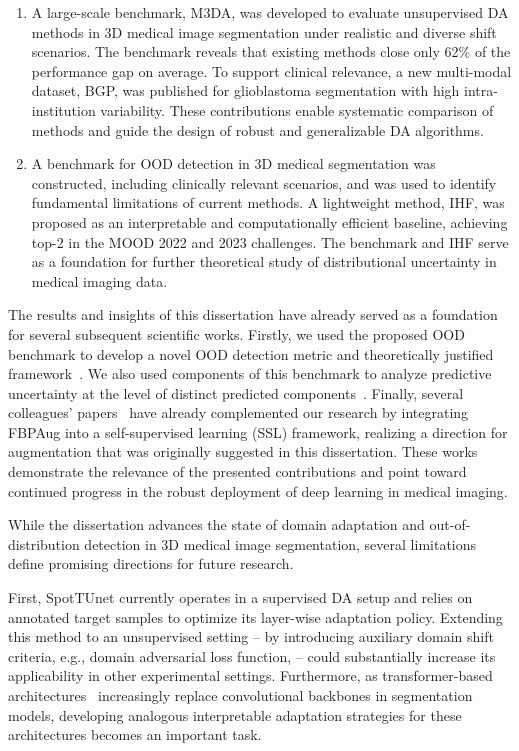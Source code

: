 \begin{enumerate}
	\item A large-scale benchmark, M3DA, was developed to evaluate unsupervised DA methods in 3D medical image segmentation under realistic and diverse shift scenarios. The benchmark reveals that existing methods close only 62\% of the performance gap on average. To support clinical relevance, a new multi-modal dataset, BGP, was published for glioblastoma segmentation with high intra-institution variability. These contributions enable systematic comparison of methods and guide the design of robust and generalizable DA algorithms.
	
	\item A benchmark for OOD detection in 3D medical segmentation was constructed, including clinically relevant scenarios, and was used to identify fundamental limitations of current methods. A lightweight method, IHF, was proposed as an interpretable and computationally efficient baseline, achieving top-2 in the MOOD 2022 and 2023 challenges. The benchmark and IHF serve as a foundation for further theoretical study of distributional uncertainty in medical imaging data.
	
\end{enumerate}

The results and insights of this dissertation have already served as a foundation for several subsequent scientific works. Firstly, we used the proposed OOD benchmark to develop a novel OOD detection metric and theoretically justified framework~\cite{vasiliuk2023redesigning}. We also used components of this benchmark to analyze predictive uncertainty at the level of distinct predicted components~\cite{vasiliuk2022exploring}. Finally, several colleagues’ papers~\cite{goncharov2023vox2vec,goncharov2024anatomical,goncharov2025screener} have already complemented our research by integrating FBPAug into a self-supervised learning (SSL) framework, realizing a direction for augmentation that was originally suggested in this dissertation. These works demonstrate the relevance of the presented contributions and point toward continued progress in the robust deployment of deep learning in medical imaging.

While the dissertation advances the state of domain adaptation and out-of-distribution detection in 3D medical image segmentation, several limitations define promising directions for future research.

First, SpotTUnet currently operates in a supervised DA setup and relies on annotated target samples to optimize its layer-wise adaptation policy. Extending this method to an unsupervised setting -- by introducing auxiliary domain shift criteria, e.g., domain adversarial loss function, -- could substantially increase its applicability in other experimental settings. Furthermore, as transformer-based architectures~\cite{unetr} increasingly replace convolutional backbones in segmentation models, developing analogous interpretable adaptation strategies for these architectures becomes an important task.


